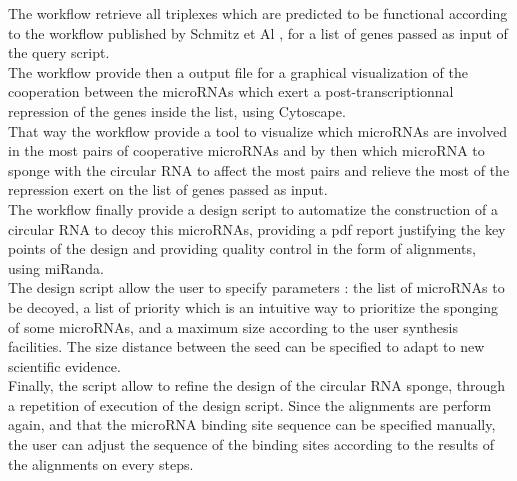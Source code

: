 \documentclass[a4paper,12pt]{report}
\begin{document}
The workflow retrieve all triplexes which are predicted to be functional according to the workflow published by Schmitz et Al \cite{triplex}, for a list of genes passed as input of the query script.\\

The workflow provide then a output file for a graphical visualization of the cooperation between the microRNAs which exert a post-transcriptionnal repression of the genes inside the list, using Cytoscape\cite{cytoscape}.\\

That way the workflow provide a tool to visualize which microRNAs are involved in the most pairs of cooperative microRNAs and by then which microRNA to sponge with the circular RNA to affect the most pairs and relieve the most of the repression exert on the list of genes passed as input.\\

The workflow finally provide a design script to automatize the construction of a circular RNA to decoy this microRNAs, providing a pdf report justifying the key points of the design and providing quality control in the form of alignments, using miRanda.\\

The design script allow the user to specify parameters : the list of microRNAs to be decoyed, a list of priority which is an intuitive way to prioritize the sponging of some microRNAs, and a maximum size according to the user synthesis facilities. The size distance between the seed can be specified to adapt to new scientific evidence.\\

Finally, the script allow to refine the design of the circular RNA sponge, through a repetition of execution of the design script. Since the alignments are perform again, and that the microRNA binding site sequence can be specified manually, the user can adjust the sequence of the binding sites according to the results of the alignments on every steps.\\
\end{document}
